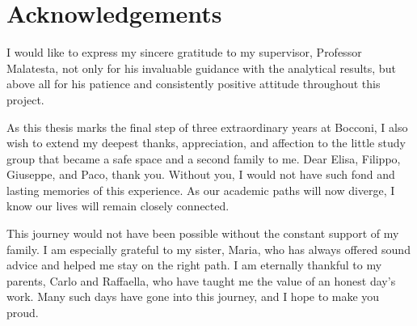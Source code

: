 \chapter*{Acknowledgements}
I would like to express my sincere gratitude to my supervisor, Professor Malatesta, not only for his invaluable guidance with the analytical results, but above all for his patience and consistently positive attitude throughout this project.

As this thesis marks the final step of three extraordinary years at Bocconi, I also wish to extend my deepest thanks, appreciation, and affection to the little study group that became a safe space and a second family to me. Dear Elisa, Filippo, Giuseppe, and Paco, thank you. Without you, I would not have such fond and lasting memories of this experience. As our academic paths will now diverge, I know our lives will remain closely connected.

This journey would not have been possible without the constant support of my family. I am especially grateful to my sister, Maria, who has always offered sound advice and helped me stay on the right path. I am eternally thankful to my parents, Carlo and Raffaella, who have taught me the value of an honest day's work. Many such days have gone into this journey, and I hope to make you proud.
